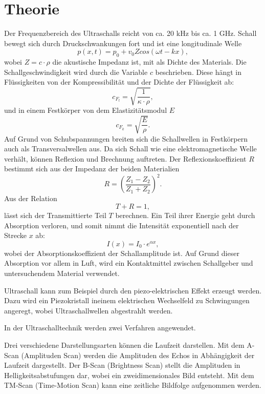 \section{Theorie}
\label{sec:Theorie}

Der Frequenzbereich des Ultraschalls reicht von ca. 20 \si{\kilo\hertz} bis ca. 1 \si{\giga\hertz}.
Schall bewegt sich durch Druckschwankungen fort und ist eine longitudinale Welle
\begin{equation}
p(x,t) = p_0 + v_0 Z cos(\omega t - kx) ,
\end{equation}
wobei $Z = c \cdot \rho $ die akustische Impedanz ist, mit \rho als Dichte des Materials.
Die Schallgeschwindigkeit wird durch die Variable $c$ beschrieben.
Diese hängt in Flüssigkeiten von der Kompressibilität \kappa und der Dichte \rho der Flüssigkeit ab:
\begin{equation}
c_{F_l} = \sqrt{\frac{1}{\kappa \cdot \rho}} ,
\end{equation}
und in einem Festkörper von dem Elastizitätsmodul $E$
\begin{equation}
c_{F_k} = \sqrt{\frac{E}{\rho}} .
\end{equation}
Auf Grund von Schubspannungen breiten sich die Schallwellen in Festkörpern auch als Transversalwellen aus.
Da sich Schall wie eine elektromagnetische Welle verhält, können Reflexion und Brechnung auftreten.
Der Reflexionskoeffizient $R$ bestimmt sich aus der Impedanz der beiden Materialien
\begin{equation}
R = (\frac{Z_1 - Z_2}{Z_1 + Z_2})^2 .
\end{equation}
Aus der Relation
\begin{equation}
T + R = 1 ,
\end{equation}
lässt sich der Transmittierte Teil $T$ berechnen.
Ein Teil ihrer Energie geht durch Absorption verloren, und somit nimmt die Intensität exponentiell nach der Strecke $x$ ab:
\begin{equation}
I(x) = I_0 \cdot e^{\alpha x} ,
\end{equation}
wobei \alpha der Absorptionskoeffizient der Schallamplitude ist. Auf Grund dieser Absorption vor allem in Luft, wird ein Kontaktmittel zwischen Schallgeber und untersuchendem Material verwendet.

Ultraschall kann zum Beispiel durch den piezo-elektrischen Effekt erzeugt werden. 
Dazu wird ein Piezokristall ineinem elektrischen Wechselfeld zu Schwingungen angeregt, wobei Ultraschallwellen abgestrahlt werden.

In der Ultraschalltechnik werden zwei Verfahren angewendet.

Drei verschiedene Darstellungsarten können die Laufzeit darstellen.
Mit dem A-Scan (Amplituden Scan) werden die Amplituden des Echos in Abhängigkeit der Laufzeit dargestellt.
Der B-Scan (Brightness Scan) stellt die Amplituden in Helligkeitsabstufungen dar, wobei ein zweidimensionales Bild entsteht.
Mit dem TM-Scan (Time-Motion Scan) kann eine zeitliche Bildfolge aufgenommen werden.



